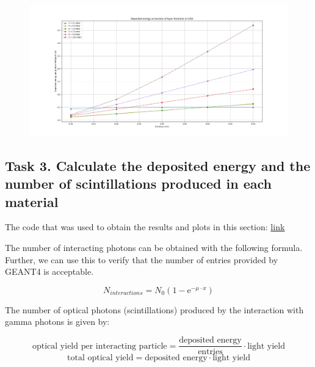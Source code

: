 \documentclass{article}
\begin{document}
\begin{figure}[H]
  \centering
  \includegraphics[width=\linewidth]{images/task2/dep_energy_thickness_LYSO_particle.png}
\end{figure}

\subsection{Task 3. Calculate the deposited energy and the number of scintillations produced in each material}

The code that was used to obtain the results and plots in this section: \href{https://github.com/rmiron30/tasks_geant4/blob/main/scintillator_task/optical_yield_task/myDesing.py}{link}

The number of interacting photons can be obtained with the following formula. Further, we can use this to verify that the number of entries provided by GEANT4 is acceptable.

\begin{equation*}
    N_{interactions} = N_0 (1-\text{e}^{-\mu \cdot x})
\end{equation*}

The number of optical photons (scintillations) produced by the interaction with gamma photons is given by:

\begin{equation*}
    \text{optical yield per interacting particle} = \frac{\text{deposited energy}}{\text{entries}} \cdot \text{light yield}
\end{equation*}
\begin{equation*}
    \text{total optical yield} = \text{deposited energy} \cdot \text{light yield}
\end{equation*}
\end{document}
